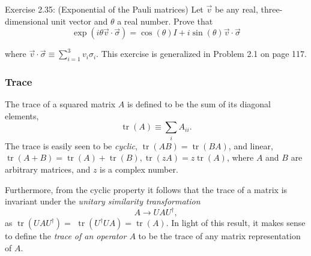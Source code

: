 \begin{exercise}
Exercise 2.35: (Exponential of the Pauli matrices) Let $\vec{v}$ be any real, three-dimensional unit vector and $\theta$ a real number. Prove that
\begin{equation}
    \exp (i \theta \vec{v} \cdot \vec{\sigma})=\cos (\theta) I+i \sin (\theta) \vec{v} \cdot \vec{\sigma}
\end{equation}

where $\vec{v} \cdot \vec{\sigma} \equiv \sum_{i=1}^{3} v_{i} \sigma_{i}$. This exercise is generalized in Problem 2.1 on page 117.
\end{exercise}

\subsubsection{Trace}

The trace of a squared matrix $A$ is defined to be the sum of its diagonal elements,
\begin{equation}
    \operatorname{tr}(A) \equiv \sum_{i} A_{i i}.
\end{equation}
The trace is easily seen to be \textit{cyclic}, $\operatorname{tr}(A B)=\operatorname{tr}(B A)$, and linear, $\operatorname{tr}(A+B)=\operatorname{tr}(A)+\operatorname{tr}(B), \operatorname{tr}(z A)=z \operatorname{tr}(A)$, where $A$ and $B$ are arbitrary matrices, and $z$ is a complex number. 

Furthermore, from the cyclic property it follows that the trace of a matrix is invariant under the \textit{unitary similarity transformation} 
\begin{equation}
    A \rightarrow U A U^{\dagger},
\end{equation}
as $\operatorname{tr}\left(U A U^{\dagger}\right)=$ $\operatorname{tr}\left(U^{\dagger} U A\right)=\operatorname{tr}(A)$. In light of this result, it makes sense to define the \textit{trace of an operator $A$} to be the trace of any matrix representation of $A$.

